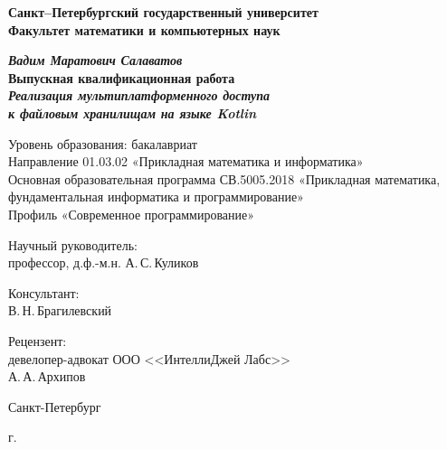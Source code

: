 \begin{titlepage}
\begin{center}

\textbf{Санкт--Петербургский государственный университет}\\
\textbf{Факультет математики и компьютерных наук}


\vspace{35mm}

\textbf{\textit{\large Вадим Маратович Салаватов}} \\[8mm]
\textbf{\large Выпускная квалификационная работа}\\[3mm]
\textbf{\textit{\large Реализация мультиплатформенного доступа\\ к файловым хранилищам на языке Kotlin}}

\vspace{20mm}
Уровень образования: бакалавриат\\
Направление 01.03.02 «Прикладная математика и информатика»\\
Основная образовательная программа СВ.5005.2018
«Прикладная математика, фундаментальная информатика и программирование»\\
Профиль «Современное программирование»\\[20mm]


\begin{flushright}
\begin{minipage}[t]{0.65\textwidth}
{Научный руководитель:} \\
профессор, д.ф.-м.н. А.\,С.\,Куликов
\vspace{4mm}

{Консультант:} \\
\todo{} В.\,Н.\,Брагилевский
\vspace{4mm}

{Рецензент:} \\
девелопер-адвокат ООО <<ИнтеллиДжей Лабс>>\\ А.\,А.\,Архипов
\end{minipage}
\end{flushright}

\vfill

{Санкт-Петербург}
\par{\the\year{} г.}
\end{center}
\end{titlepage}
\restoregeometry
\addtocounter{page}{1}
